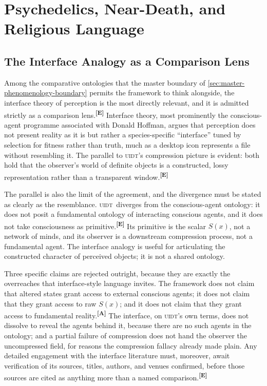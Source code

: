 \documentclass[12pt,a4paper,twoside]{article}
\theoremstyle{plain}
\theoremstyle{definition}
\theoremstyle{remark}
\newcommand{\UIDT}{\textsc{uidt}}
\newcommand{\catmark}[1]{\textsuperscript{\textsf{\textbf{[#1]}}}}
\begin{document}
\newpage
\section{Psychedelics, Near-Death, and Religious Language}
\label{sec:dmt-nde-mysticism}

\subsection{The Interface Analogy as a Comparison Lens}
\label{subsec:interface-analogy}

Among the comparative ontologies that the master boundary of \cref{sec:master-phenomenology-boundary} permits the framework to think alongside, the interface theory of perception is the most directly relevant, and it is admitted strictly as a comparison lens.\catmark{E} Interface theory, most prominently the conscious-agent programme associated with Donald Hoffman, argues that perception does not present reality as it is but rather a species-specific ``interface'' tuned by selection for fitness rather than truth, much as a desktop icon represents a file without resembling it. The parallel to \UIDT's compression picture is evident: both hold that the observer's world of definite objects is a constructed, lossy representation rather than a transparent window.\catmark{E}

The parallel is also the limit of the agreement, and the divergence must be stated as clearly as the resemblance. \UIDT\ diverges from the conscious-agent ontology: it does not posit a fundamental ontology of interacting conscious agents, and it does not take consciousness as primitive.\catmark{E} Its primitive is the scalar $S(x)$, not a network of minds, and its observer is a downstream compression process, not a fundamental agent. The interface analogy is useful for articulating the constructed character of perceived objects; it is not a shared ontology.

Three specific claims are rejected outright, because they are exactly the overreaches that interface-style language invites. The framework does not claim that altered states grant access to external conscious agents; it does not claim that they grant access to raw $S(x)$; and it does not claim that they grant access to fundamental reality.\catmark{A} The interface, on \UIDT's own terms, does not dissolve to reveal the agents behind it, because there are no such agents in the ontology; and a partial failure of compression does not hand the observer the uncompressed field, for reasons the compression fallacy already made plain. Any detailed engagement with the interface literature must, moreover, await verification of its sources, titles, authors, and venues confirmed, before those sources are cited as anything more than a named comparison.\catmark{E}
\end{document}
